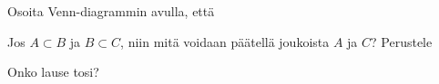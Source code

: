 \begin{tehtava}
Osoita Venn-diagrammin avulla, että
    \begin{alakohdat}
        \alakohta{\[
X\setminus (A\cup B) = (X\setminus A)\cap (X\setminus B),
\]}
        \alakohta{\[
X \setminus (A\cap B) = (X\setminus A)\cup (X\setminus B).
\]}
      
    \end{alakohdat}

    \begin{vastaus}
    
        \begin{alakohdat}
        \alakohta{}
        \alakohta{}
        \end{alakohdat}
    \end{vastaus}
\end{tehtava}


\begin{tehtava}
Jos $A\subset B$ ja $B\subset C$, niin mitä voidaan päätellä joukoista $A$ ja $C$? Perustele 
    \begin{alakohdat}
    \end{alakohdat}

    \begin{vastaus}
    
        \begin{alakohdat}
        \alakohta{}
        \alakohta{}
        \end{alakohdat}
    \end{vastaus}
\end{tehtava}


\begin{tehtava}
Onko lause tosi?
    \begin{alakohdat}
    \end{alakohdat}

    \begin{vastaus}
    
        \begin{alakohdat}
        \alakohta{}
        \alakohta{}
        \alakohta{}
        \alakohta{} 
        \alakohta{}
        \end{alakohdat}
    \end{vastaus}
\end{tehtava}


